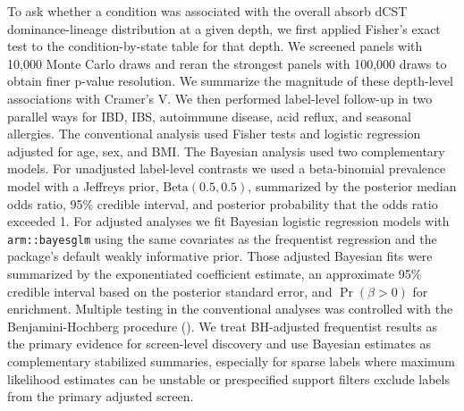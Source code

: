 \documentclass[
  11pt,
]{article}
\begin{document}
To ask whether a condition was associated with the overall absorb dCST
dominance-lineage distribution at a given depth, we first applied Fisher's exact test to
the condition-by-state table for that depth. We screened panels with
10,000 Monte Carlo draws and reran the strongest panels with 100,000
draws to obtain finer p-value resolution. We summarize the magnitude of
these depth-level associations with Cramer's V. We then performed
label-level follow-up in two parallel ways for IBD, IBS, autoimmune
disease, acid reflux, and seasonal allergies. The conventional analysis
used Fisher tests and logistic regression adjusted for age, sex, and BMI.
The Bayesian analysis used two complementary models. For unadjusted
label-level contrasts we used a beta-binomial prevalence model with a
Jeffreys prior, \(\mathrm{Beta}(0.5, 0.5)\), summarized by the posterior
median odds ratio, 95\% credible interval, and posterior probability
that the odds ratio exceeded 1. For adjusted analyses we fit Bayesian
logistic regression models with \texttt{arm::bayesglm} using the same
covariates as the frequentist regression and the package's default
weakly informative prior. Those adjusted Bayesian fits were summarized
by the exponentiated coefficient estimate, an approximate 95\% credible
interval based on the posterior standard error, and \(\Pr(\beta > 0)\)
for enrichment. Multiple testing in the conventional analyses was
controlled with the Benjamini-Hochberg procedure
().
We treat BH-adjusted frequentist results as the primary evidence for
screen-level discovery and use Bayesian estimates as complementary
stabilized summaries, especially for sparse labels where maximum
likelihood estimates can be unstable or prespecified support filters
exclude labels from the primary adjusted screen.
\end{document}
